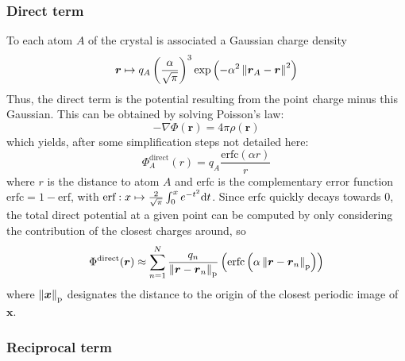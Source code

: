 \documentclass[main.tex]{subfiles}
\begin{document}
\subsubsection{Direct term}

To each atom $A$ of the crystal is associated a Gaussian charge density
\[\boldsymbol r\mapsto q_A\left(\frac\alpha{\sqrt\pi}\right)^3\exp\left(-\alpha^2\left\|\boldsymbol r_A - \boldsymbol r\right\|^2\right)\label{gaussian_charge}\]
Thus, the direct term is the potential resulting from the point charge minus this Gaussian. This can be obtained by solving Poisson's law:
\[-\nabla\Phi(\boldsymbol r) = 4\pi\rho(\boldsymbol r)\label{Poisson}\]
which yields, after some simplification steps not detailed here:
\[\Phi^\text{direct}_A(r) = q_A\frac{\text{erfc}(\alpha r)}r\]
where $r$ is the distance to atom $A$ and $\text{erfc}$ is the complementary error function $\text{erfc} = 1 - \text{erf}$, with $\text{erf}:x\mapsto\frac2{\sqrt\pi}\int_0^xe^{-t^2}\text dt$. Since $\text{erfc}$ quickly decays towards $0$, the total direct potential at a given point can be computed by only considering the contribution of the closest charges around, so
\[\Phi^\text{direct}(\boldsymbol r) \approx \sum_{n=1}^N \frac{q_n}{\left\|\boldsymbol r - \boldsymbol r_n\right\|_\text{p}}\left(\text{erfc}\left(\alpha \left\|\boldsymbol r - \boldsymbol r_n\right\|_\text{p}\right)\right)\]
where $\left\|\boldsymbol x\right\|_\text{p}$ designates the distance to the origin of the closest periodic image of $\boldsymbol x$.

\subsubsection{Reciprocal term}
\end{document}
